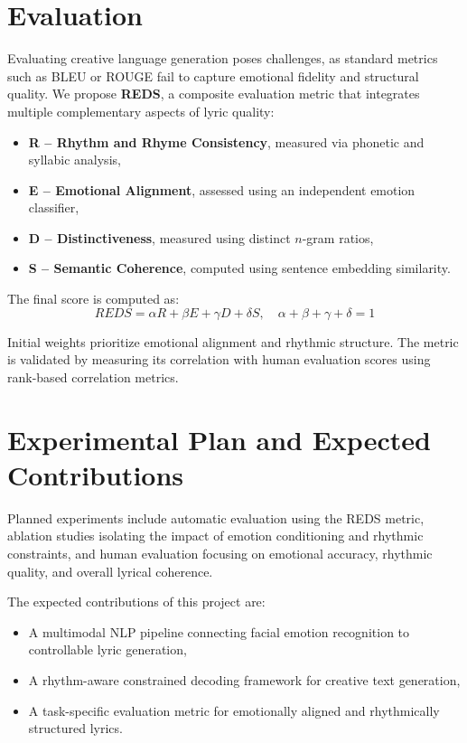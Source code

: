 \documentclass[11pt]{article}
\begin{document}
\section{Evaluation}

Evaluating creative language generation poses challenges, as standard metrics such as BLEU or ROUGE fail to capture emotional fidelity and structural quality. We propose \textbf{REDS}, a composite evaluation metric that integrates multiple complementary aspects of lyric quality:

\begin{itemize}
    \item \textbf{R -- Rhythm and Rhyme Consistency}, measured via phonetic and syllabic analysis,
    \item \textbf{E -- Emotional Alignment}, assessed using an independent emotion classifier,
    \item \textbf{D -- Distinctiveness}, measured using distinct $n$-gram ratios,
    \item \textbf{S -- Semantic Coherence}, computed using sentence embedding similarity.
\end{itemize}

The final score is computed as:
\[
REDS = \alpha R + \beta E + \gamma D + \delta S, \quad \alpha + \beta + \gamma + \delta = 1
\]

Initial weights prioritize emotional alignment and rhythmic structure. The metric is validated by measuring its correlation with human evaluation scores using rank-based correlation metrics.

\section{Experimental Plan and Expected Contributions}

Planned experiments include automatic evaluation using the REDS metric, ablation studies isolating the impact of emotion conditioning and rhythmic constraints, and human evaluation focusing on emotional accuracy, rhythmic quality, and overall lyrical coherence.

The expected contributions of this project are:
\begin{itemize}
    \item A multimodal NLP pipeline connecting facial emotion recognition to controllable lyric generation,
    \item A rhythm-aware constrained decoding framework for creative text generation,
    \item A task-specific evaluation metric for emotionally aligned and rhythmically structured lyrics.
\end{itemize}
\end{document}

